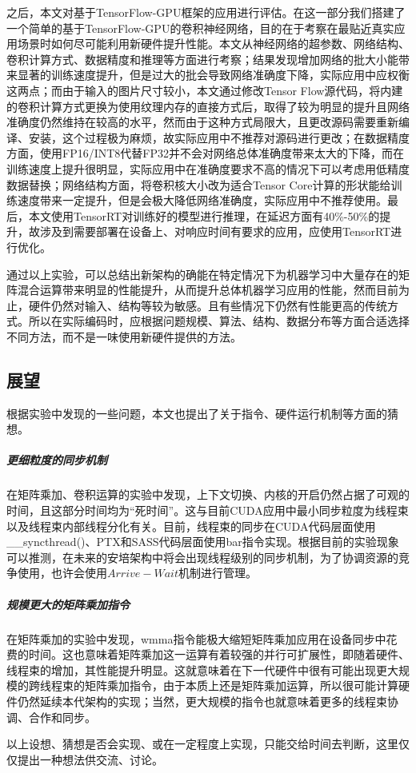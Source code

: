 \par 之后，本文对基于TensorFlow-GPU框架的应用进行评估。在这一部分我们搭建了一个简单的基于TensorFlow-GPU的卷积神经网络，目的在于考察在最贴近真实应用场景时如何尽可能利用新硬件提升性能。本文从神经网络的超参数、网络结构、卷积计算方式、数据精度和推理等方面进行考察；结果发现增加网络的批大小能带来显著的训练速度提升，但是过大的批会导致网络准确度下降，实际应用中应权衡这两点；而由于输入的图片尺寸较小，本文通过修改Tensor Flow源代码，将内建的卷积计算方式更换为使用纹理内存的直接方式后，取得了较为明显的提升且网络准确度仍然维持在较高的水平，然而由于这种方式局限大，且更改源码需要重新编译、安装，这个过程极为麻烦，故实际应用中不推荐对源码进行更改；在数据精度方面，使用FP16/INT8代替FP32并不会对网络总体准确度带来太大的下降，而在训练速度上提升很明显，实际应用中在准确度要求不高的情况下可以考虑用低精度数据替换；网络结构方面，将卷积核大小改为适合Tensor Core计算的形状能给训练速度带来一定提升，但是会极大降低网络准确度，实际应用中不推荐使用。最后，本文使用TensorRT对训练好的模型进行推理，在延迟方面有40\%-50\%的提升，故涉及到需要部署在设备上、对响应时间有要求的应用，应使用TensorRT进行优化。
\par 通过以上实验，可以总结出新架构的确能在特定情况下为机器学习中大量存在的矩阵混合运算带来明显的性能提升，从而提升总体机器学习应用的性能，然而目前为止，硬件仍然对输入、结构等较为敏感。且有些情况下仍然有性能更高的传统方式。所以在实际编码时，应根据问题规模、算法、结构、数据分布等方面合适选择不同方法，而不是一味使用新硬件提供的方法。
\subsection{展望}
\par 根据实验中发现的一些问题，本文也提出了关于指令、硬件运行机制等方面的猜想。
\subparagraph{更细粒度的同步机制}
\par 在矩阵乘加、卷积运算的实验中发现，上下文切换、内核的开启仍然占据了可观的时间，且这部分时间均为“死时间”。这与目前CUDA应用中最小同步粒度为线程束以及线程束内部线程分化有关。目前，线程束的同步在CUDA代码层面使用\_\_syncthread()、PTX和SASS代码层面使用bar指令实现。根据目前的实验现象可以推测，在未来的安培架构中将会出现线程级别的同步机制，为了协调资源的竞争使用，也许会使用$ Arrive-Wait $机制进行管理。
\subparagraph{规模更大的矩阵乘加指令}
\par 在矩阵乘加的实验中发现，wmma指令能极大缩短矩阵乘加应用在设备同步中花 费的时间。这也意味着矩阵乘加这一运算有着较强的并行可扩展性，即随着硬件、线程束的增加，其性能提升明显\cite{SCALABLITY}。这就意味着在下一代硬件中很有可能出现更大规模的跨线程束的矩阵乘加指令，由于本质上还是矩阵乘加运算，所以很可能计算硬件仍然延续本代架构的实现；当然，更大规模的指令也就意味着更多的线程束协调、合作和同步。
\par 以上设想、猜想是否会实现、或在一定程度上实现，只能交给时间去判断，这里仅仅提出一种想法供交流、讨论。
